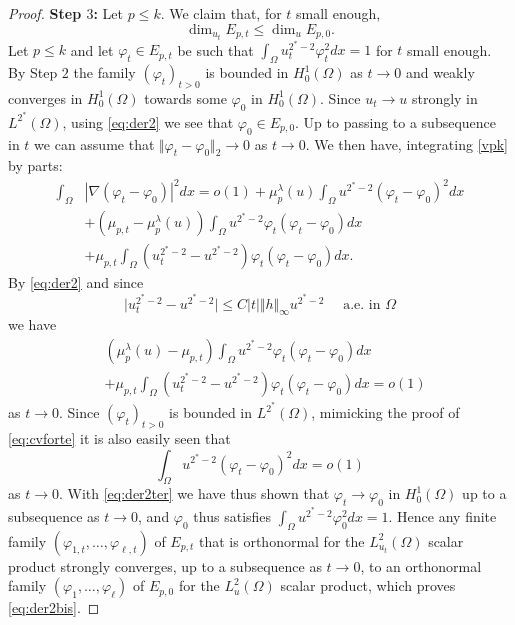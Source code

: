 \documentclass[10pt]{amsart}
\numberwithin{equation}{section}
\newcommand{\vp}{\varphi}
\newcommand{\Om}{\Omega}
\theoremstyle{plain}
\theoremstyle{remark}
\begin{document}
\begin{proof}
\textbf{Step $3$:} Let $p \le k$. We claim that, for $t$ small enough,
\begin{equation} \label{eq:der2bis}
\dim_{u_t} E_{p,t} \le \dim_u E_{p,0}.
\end{equation}
Let $p \le k$ and let $\vp_t \in E_{p,t}$ be such that $\int_\Om u_t^{2^*-2} \vp_t^2dx = 1$ for $t$ small enough. By Step $2$ the family $(\vp_t)_{t >0}$ is bounded in $H^1_0(\Om)$ as $t \to 0$ and weakly converges in $H^1_0(\Om)$ towards some $\vp_0$ in $H^1_0(\Om)$. Since $u_t \to u$ strongly in $L^{2^*}(\Om)$, using \eqref{eq:der2} we see that $\vp_0 \in E_{p,0}$. Up to passing to a subsequence in $t$ we can assume that $\Vert \vp_t - \vp_0\Vert_{2} \to 0$ as $t \to 0$. We then have, integrating \eqref{vpk} by parts: 
\begin{equation} \label{eq:der2ter}
 \begin{aligned}
\int_{\Om}& |\nabla(\vp_t - \vp_0)|^2dx = o(1) + \mu_{p}^{\lambda}(u)\int_{\Om} u^{2^*-2} (\vp_t - \vp_0)^2 dx \\
&+ (\mu_{p,t} - \mu_{p}^{\lambda}(u)  )\int_{\Om}u^{2^*-2} \vp_t(\vp_t - \vp_0) dx \\
&+ \mu_{p,t} \int_{\Om}(u_t^{2^*-2} - u^{2^*-2} ) \vp_t(\vp_t - \vp_0) dx.
\end{aligned} \end{equation}
By \eqref{eq:der2} and since 
\begin{equation} \label{eq:DLu}
\big| u_t^{2^*-2} - u^{2^*-2} \big| \le C |t| \Vert h \Vert_{\infty} u^{2^*-2} \quad \text{ a.e. in } \Om 
\end{equation}
we have 
$$ \begin{aligned}
& (\mu_{p}^{\lambda}(u) - \mu_{p,t} )\int_{\Om}u^{2^*-2} \vp_t(\vp_t - \vp_0) dx \\
&+ \mu_{p,t} \int_{\Om}(u_t^{2^*-2} - u^{2^*-2} ) \vp_t(\vp_t - \vp_0) dx = o(1) 
\end{aligned}
$$
as $t \to 0$. Since $(\vp_t)_{t>0}$ is bounded in $L^{2^*}(\Om)$, mimicking the proof of \eqref{eq:cvforte} it is also easily seen that
$$ \int_{\Om} u^{2^*-2} (\vp_t - \vp_0)^2 dx  = o(1)$$
as $t \to 0$. With \eqref{eq:der2ter} we have thus shown that $\vp_t \to \vp_0$ in $H^1_0(\Om)$ up to a subsequence as $t \to 0$, and $\vp_0$ thus satisfies $\int_\Om u^{2^*-2} \vp_0^2dx = 1$. Hence any finite family $(\vp_{1,t}, \dots, \vp_{\ell,t})$ of $E_{p,t}$ that is orthonormal for the $L^{2}_{u_t}(\Om)$ scalar product strongly converges, up to a subsequence as $t \to 0$, to an orthonormal family $(\vp_1, \dots, \vp_\ell)$ of $E_{p,0}$ for the $L^2_u(\Om)$ scalar product, which proves \eqref{eq:der2bis}.


\end{proof}
\end{document}
